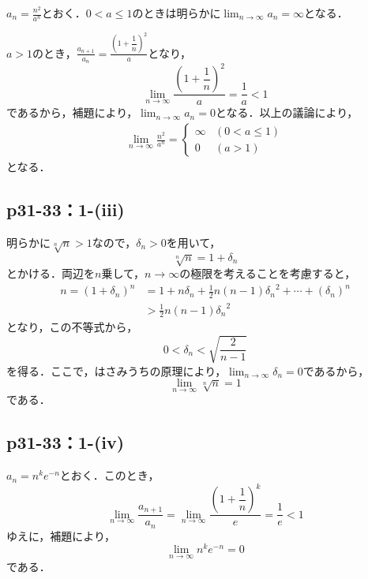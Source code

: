 \documentclass[a4paper,10pt,fleqn]{ltjsarticle}
\begin{document}
\begin{tleftbar}
        $a_n = \frac{n^2}{a^n}$とおく．$0<a \le 1$のときは明らかに$\lim_{n \to \infty} a_n=\infty$となる．\par 
        $a>1$のとき，$\frac{a_{n+1}}{a_n} =\frac{\left(1+\dfrac{1}{n}\right)^2}{a}$となり，
        \[
            \lim_{n \to \infty} \frac{\left(1+\dfrac{1}{n}\right)^2}{a} = \frac{1}{a} <1
        \]
        であるから，補題により，$\lim_{n \to \infty} a_n =0$となる．以上の議論により，
        \begin{align*}
            \lim_{n \to \infty} \frac{n^2}{a^n}
            =
            \begin{cases}
                \infty & (0<a \le 1) \\
                0 & (a>1)
            \end{cases}
        \end{align*}
        となる．
	\end{tleftbar}
    \subsection*{p31-33：1-(iii)}
\begin{tleftbar}
    明らかに$\sqrt[n]{n} >1$なので，$\delta_n >0$を用いて，
    \[
        \sqrt[n]{n} = 1+ \delta_n
    \]
    とかける．両辺を$n$乗して，$n \to \infty$の極限を考えることを考慮すると，
    \begin{align*}
        n = (1+\delta_n)^n &=1 + n \delta_n + \frac{1}{2}n(n-1) {\delta_n}^2 + \cdots + (\delta_n)^n \\
        & > \frac{1}{2}n(n-1) {\delta_n}^2
    \end{align*}
    となり，この不等式から，
    \[
        0<\delta_n < \sqrt{\frac{2}{n-1}}
    \]
    を得る．ここで，はさみうちの原理により，$\lim_{n \to \infty} \delta_n =0$であるから，
    \[
        \lim_{n \to \infty} \sqrt[n]{n} =1
    \]
    である．
\end{tleftbar}

\subsection*{p31-33：1-(iv)}
\begin{tleftbar}
      $a_n= n^k e^{-n}$とおく．このとき，
      \[
          \lim_{n \to \infty} \frac{a_{n+1}}{a_n} =  \lim_{n \to \infty} \frac{\left(1+\dfrac{1}{n}\right)^k}{e} =\frac{1}{e} <1
      \]
      ゆえに，補題により，
      \[
        \lim_{n \to \infty} n^k e^{-n}=0
      \]
      である．
\end{tleftbar}
\end{document}
